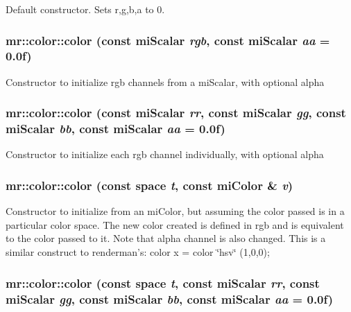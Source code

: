 Default constructor. Sets r,g,b,a to 0. 

\subsubsection{\setlength{\rightskip}{0pt plus 5cm}mr::color::color (const mi\-Scalar {\em rgb}, const mi\-Scalar {\em aa} = 0.0f)\hspace{0.3cm}{\tt  [inline]}}\label{structmr_1_1color_z1_5}


Constructor to initialize rgb channels from a mi\-Scalar, with optional alpha 
\subsubsection{\setlength{\rightskip}{0pt plus 5cm}mr::color::color (const mi\-Scalar {\em rr}, const mi\-Scalar {\em gg}, const mi\-Scalar {\em bb}, const mi\-Scalar {\em aa} = 0.0f)\hspace{0.3cm}{\tt  [inline]}}\label{structmr_1_1color_z1_6}


Constructor to initialize each rgb channel individually, with optional alpha 
\subsubsection{\setlength{\rightskip}{0pt plus 5cm}mr::color::color (const {\bf space} {\em t}, const mi\-Color \& {\em v})\hspace{0.3cm}{\tt  [inline]}}\label{structmr_1_1color_z1_7}


Constructor to initialize from an mi\-Color, but assuming the color passed is in a particular color space. The new color created is defined in rgb and is equivalent to the color passed to it. Note that alpha channel is also changed. This is a similar construct to renderman's: color x = color \char`\"{}hsv\char`\"{} (1,0,0); 
\subsubsection{\setlength{\rightskip}{0pt plus 5cm}mr::color::color (const {\bf space} {\em t}, const mi\-Scalar {\em rr}, const mi\-Scalar {\em gg}, const mi\-Scalar {\em bb}, const mi\-Scalar {\em aa} = 0.0f)\hspace{0.3cm}{\tt  [inline]}}\label{structmr_1_1color_z1_8}


